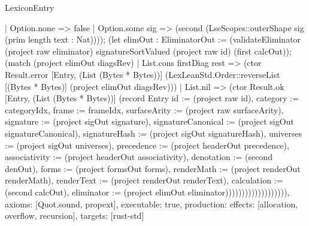 \begin{lexlean}{LexiconEntry}
\begin{semanticmodule}
{            | Option.none => false
            | Option.some sig => (second (LseScopes::outerShape sig (prim length text : Nat)))); (let elimOut : EliminatorOut := (validateEliminator (project raw eliminator) signatureSortValued (project raw id) (first calcOut)); (match (project elimOut diagsRev)
            | List.cons firstDiag rest => (ctor Result.error [Entry, (List (Bytes * Bytes))] (LexLeanStd.Order::reverseList [(Bytes * Bytes)] (project elimOut diagsRev)))
            | List.nil => (ctor Result.ok [Entry, (List (Bytes * Bytes))] (record Entry {id := (project raw id), category := categoryIdx, frame := frameIdx, surfaceArity := (project raw surfaceArity), signature := (project sigOut signature), signatureCanonical := (project sigOut signatureCanonical), signatureHash := (project sigOut signatureHash), universes := (project sigOut universes), precedence := (project headerOut precedence), associativity := (project headerOut associativity), denotation := (second denOut), forms := (project formsOut forms), renderMath := (project renderOut renderMath), renderText := (project renderOut renderText), calculation := (second calcOut), eliminator := (project elimOut eliminator)})))))))))))))))))),
  axioms: [Quot.sound, propext],
  executable: true,
  production: {effects: [allocation, overflow, recursion], targets: [rust-std]}
}
\end{semanticmodule}
\end{lexlean}
